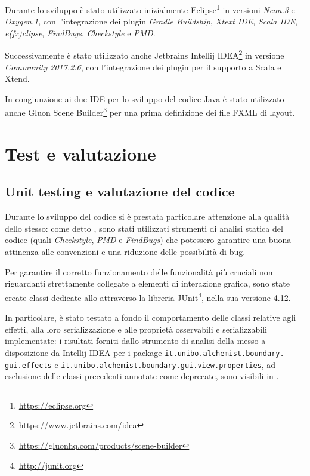                 Durante lo sviluppo è stato utilizzato inizialmente Eclipse\footnote{\url{https://eclipse.org}} in versioni \textit{Neon.3} e \textit{Oxygen.1}, con l'integrazione dei plugin \emph{Gradle Buildship}, \emph{Xtext IDE}, \emph{Scala IDE}, \emph{e(fx)clipse}, \emph{FindBugs}, \emph{Checkstyle} e \emph{PMD}.

                Successivamente è stato utilizzato anche Jetbrains Intellij IDEA\footnote{\url{https://www.jetbrains.com/idea}} in versione \textit{Community 2017.2.6}, con l'integrazione dei plugin per il supporto a Scala e Xtend.

                In congiunzione ai due IDE per lo sviluppo del codice Java è stato utilizzato anche Gluon Scene Builder\footnote{\url{https://gluonhq.com/products/scene-builder}} per una prima definizione dei file FXML di layout.

        \section{Test e valutazione}\label{sec:test}
            \subsection{Unit testing e valutazione del codice}\label{subsec:junit}
                Durante lo sviluppo del codice si è prestata particolare attenzione alla qualità dello stesso: come detto , sono stati utilizzati strumenti di analisi statica del codice (quali \emph{Checkstyle}, \emph{PMD} e \emph{FindBugs}) che potessero garantire una buona attinenza alle convenzioni e una riduzione delle possibilità di bug.

                Per garantire il corretto funzionamento delle funzionalità più cruciali non riguardanti strettamente collegate a elementi di interazione grafica, sono state create classi dedicate allo  attraverso la libreria JUnit\footnote{\url{http://junit.org}}, nella sua versione \href{http://junit.org/junit4/}{4.12}.

                In particolare, è stato testato a fondo il comportamento delle classi relative agli effetti, alla loro serializzazione e alle proprietà osservabili e serializzabili implementate: i risultati forniti dallo strumento di analisi della  messo a disposizione da Intellij IDEA per i package \texttt{it\dothyp unibo\dothyp alchemist\dothyp boundary\dothyp gui\dothyp effects} e \texttt{it\dothyp unibo\dothyp alchemist\dothyp boundary\dothyp gui\dothyp view\dothyp properties}, ad esclusione delle classi precedenti annotate come deprecate, sono visibili in .


